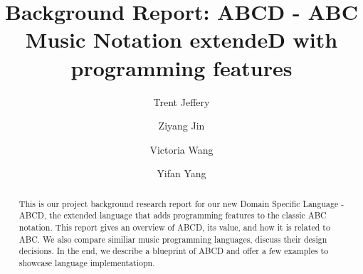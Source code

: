 \documentclass[sigconf]{acmart}
\begin{document}
\title{Background Report: ABCD - ABC Music Notation extendeD with programming features}


\author{Trent Jeffery}

\author{Ziyang Jin}

\author{Victoria Wang}

\author{Yifan Yang}


\begin{abstract}
This is our project background research report for our new Domain Specific Language - ABCD, the extended language that adds programming features to the classic ABC notation. This report gives an overview of ABCD, its value, and how it is related to ABC. We also compare similiar music programming languages, discuss their design decisions. In the end, we describe a blueprint of ABCD and offer a few examples to showcase language implementatiopn.
\end{abstract}




\maketitle





\end{document}
